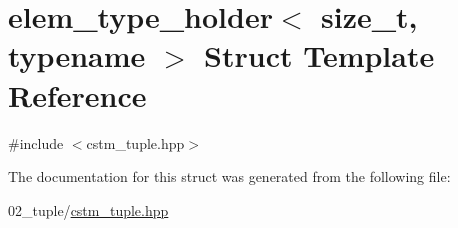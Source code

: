 \hypertarget{structelem__type__holder}{}\section{elem\+\_\+type\+\_\+holder$<$ size\+\_\+t, typename $>$ Struct Template Reference}
\label{structelem__type__holder}


{\ttfamily \#include $<$cstm\+\_\+tuple.\+hpp$>$}



The documentation for this struct was generated from the following file\+:\begin{DoxyCompactItemize}
\item 
02\+\_\+tuple/\hyperlink{cstm__tuple_8hpp}{cstm\+\_\+tuple.\+hpp}\end{DoxyCompactItemize}
